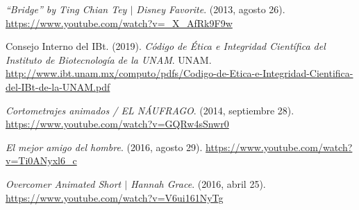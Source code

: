 \documentclass[12pt]{article}
\begin{document}
\newpage
\begin{thebibliography}{X}
	 \textit{“Bridge” by Ting Chian Tey $|$ Disney Favorite}. (2013, agosto 26). \url{https://www.youtube.com/watch?v=_X_AfRk9F9w}

	 Consejo Interno del IBt. (2019). \textit{ Código de Ética e Integridad Científica del Instituto de Biotecnología de la UNAM}. UNAM. \url{http://www.ibt.unam.mx/computo/pdfs/Codigo-de-Etica-e-Integridad-Cientifica-del-IBt-de-la-UNAM.pdf}
	
	 \textit{Cortometrajes animados / EL NÁUFRAGO}. (2014, septiembre 28). \url{ https://www.youtube.com/watch?v=GQRw4sSnwr0}

	 \textit{El mejor amigo del hombre}. (2016, agosto 29). \url{https://www.youtube.com/watch?v=Ti0ANyxl6_c}

	 \textit{Overcomer Animated Short $|$ Hannah Grace}. (2016, abril 25). \url{https://www.youtube.com/watch?v=V6ui161NyTg}

\end{thebibliography}
\end{document}
